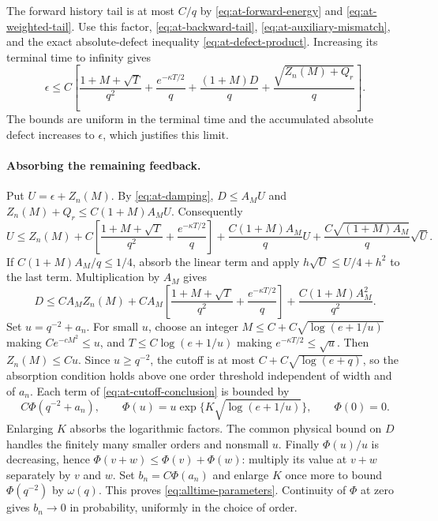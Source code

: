The forward history tail is at most $C/q$ by
\eqref{eq:at-forward-energy} and \eqref{eq:at-weighted-tail}.
Use this factor, \eqref{eq:at-backward-tail},
\eqref{eq:at-auxiliary-mismatch}, and the exact absolute-defect inequality
\eqref{eq:at-defect-product}.  Increasing its terminal time to infinity
gives
\begin{equation}
 \epsilon\le C\left[
 \frac{1+M+\sqrt T}{q^2}+\frac{e^{-\kappa T/2}}q
 +\frac{(1+M)D}{q}+\frac{\sqrt{Z_n(M)+Q_r}}q\right].
 \label{eq:at-quadratic-source}
\end{equation}
The bounds are uniform in the terminal time and the accumulated absolute
defect increases to $\epsilon$, which justifies this limit.

\paragraph{Absorbing the remaining feedback.}
Put $U=\epsilon+Z_n(M)$.  By \eqref{eq:at-damping},
$D\le A_MU$ and $Z_n(M)+Q_r\le C(1+M)A_MU$.  Consequently
\[
 U\le Z_n(M)+C\left[\frac{1+M+\sqrt T}{q^2}
                       +\frac{e^{-\kappa T/2}}q\right]
       +\frac{C(1+M)A_M}{q}U
       +\frac{C\sqrt{(1+M)A_M}}q\sqrt U.
\]
If $C(1+M)A_M/q\le1/4$, absorb the linear term and apply
$h\sqrt U\le U/4+h^2$ to the last term.  Multiplication by $A_M$ gives
\begin{equation}
 D\le CA_MZ_n(M)
  +CA_M\left[\frac{1+M+\sqrt T}{q^2}
                              +\frac{e^{-\kappa T/2}}q\right]
  +\frac{C(1+M)A_M^2}{q^2}.
 \label{eq:at-cutoff-conclusion}
\end{equation}
Set $u=q^{-2}+a_n$.  For small $u$, choose an integer
$M\le C+C\sqrt{\log(e+1/u)}$ making $Ce^{-cM^2}\le u$, and
$T\le C\log(e+1/u)$ making $e^{-\kappa T/2}\le\sqrt u$.
Then $Z_n(M)\le Cu$.  Since $u\ge q^{-2}$, the cutoff is at most
$C+C\sqrt{\log(e+q)}$, so the absorption condition holds above one
order threshold independent of width and of $a_n$.  Each term of
\eqref{eq:at-cutoff-conclusion} is bounded by
\begin{equation}
 C\Phi(q^{-2}+a_n),\qquad
 \Phi(u)=u\exp\{K\sqrt{\log(e+1/u)}\},\qquad\Phi(0)=0.
 \label{eq:at-phi-bound}
\end{equation}
Enlarging $K$ absorbs the logarithmic factors.  The common physical bound
on $D$ handles the finitely many smaller orders and nonsmall $u$.
Finally $\Phi(u)/u$ is decreasing, hence
$\Phi(v+w)\le\Phi(v)+\Phi(w)$: multiply its value at $v+w$ separately
by $v$ and $w$.  Set $b_n=C\Phi(a_n)$ and enlarge $K$ once more to
bound $\Phi(q^{-2})$ by $\omega(q)$.  This proves
\eqref{eq:alltime-parameters}.  Continuity of $\Phi$ at zero gives
$b_n\to0$ in probability, uniformly in the choice of order.

